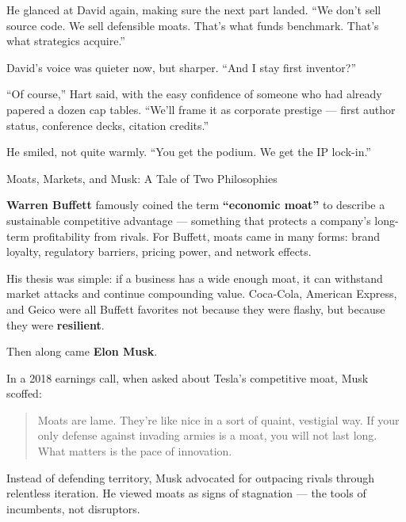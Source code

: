 He glanced at David again, making sure the next part landed. “We don’t sell source code. We sell defensible moats. That’s 
what funds benchmark. That’s what strategics acquire.”

David’s voice was quieter now, but sharper. “And I stay first inventor?”

“Of course,” Hart said, with the easy confidence of someone who had already papered a dozen cap tables. “We’ll frame it 
as corporate prestige — first author status, conference decks, citation credits.”

He smiled, not quite warmly. “You get the podium. We get the IP lock-in.”

\medskip

\begin{HistoricalSidebar}{Moats, Markets, and Musk: A Tale of Two Philosophies}

  \textbf{Warren Buffett} famously coined the term \textbf{“economic moat”} to describe a sustainable competitive advantage — 
  something that protects a company’s long-term profitability from rivals. For Buffett, moats came in many forms: 
  brand loyalty, regulatory barriers, pricing power, and network effects.  
  
  \medskip
  
  His thesis was simple: if a business has a wide enough moat, it can withstand market attacks and continue compounding value. 
  Coca-Cola, American Express, and Geico were all Buffett favorites not because they were flashy, but because they were 
  \textbf{resilient}.  
  
  \medskip
  
  Then along came \textbf{Elon Musk}.  
  
  \medskip
  
  In a 2018 earnings call, when asked about Tesla’s competitive moat, Musk scoffed:
  
  \begin{quote}
  Moats are lame. They’re like nice in a sort of quaint, vestigial way. If your only defense against invading armies 
  is a moat, you will not last long. What matters is the pace of innovation.
  \end{quote}
  
  \medskip
  
  Instead of defending territory, Musk advocated for outpacing rivals through relentless iteration.  
  He viewed moats as signs of stagnation — the tools of incumbents, not disruptors.
  
  \medskip
  

\end{HistoricalSidebar}
